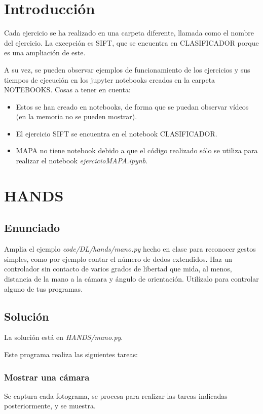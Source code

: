 \documentclass[12pt]{article}
\begin{document}

\tableofcontents
\pagebreak

\listoffigures
\pagebreak

\section*{Introducción}
Cada ejercicio se ha realizado en una carpeta diferente, llamada como el nombre del ejercicio. La excepción es SIFT, que se encuentra en CLASIFICADOR porque es una ampliación de este.

A su vez, se pueden observar ejemplos de funcionamiento de los ejercicios y sus tiempos de ejecución en los jupyter notebooks creados en la carpeta NOTEBOOKS. Cosas a tener en cuenta:
\begin{itemize}
    \item Estos se han creado en notebooks, de forma que se puedan observar vídeos (en la memoria no se pueden mostrar). 
    \item El ejercicio SIFT se encuentra en el notebook CLASIFICADOR. 
    \item MAPA no tiene notebook debido a que el código realizado sólo se utiliza para realizar el notebook\textit{ ejercicioMAPA.ipynb}.
\end{itemize}

\section{HANDS} \label{sec:hands}
\subsection*{Enunciado}
Amplia el ejemplo \textit{code/DL/hands/mano.py} hecho en clase para reconocer gestos simples, como por ejemplo contar el número de dedos extendidos. Haz un controlador sin contacto de varios grados de libertad que mida, al menos, distancia de la mano a la cámara y ángulo de orientación. Utilízalo para controlar alguno de tus programas.

\subsection*{Solución}
La solución está en \textit{HANDS/mano.py}.

Este programa realiza las siguientes tareas:
\subsubsection*{Mostrar una cámara}
Se captura cada fotograma, se procesa para realizar las tareas indicadas posteriormente, y se muestra.
\end{document}
